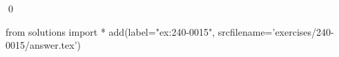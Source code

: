 
\begin{ex} 
  \label{ex:240-0015}
  
  \qed
\end{ex} 
\begin{python0}
from solutions import *
add(label="ex:240-0015",
    srcfilename='exercises/240-0015/answer.tex') 
\end{python0}
